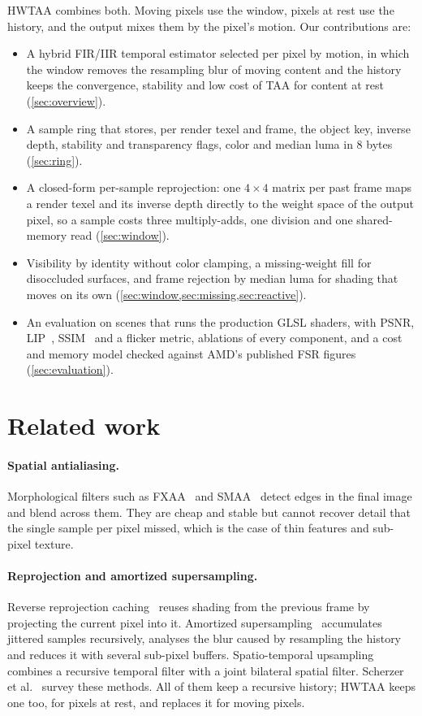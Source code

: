 \documentclass[11pt,a4paper]{article}
\newcommand{\FLIP}{\reflectbox{F}LIP}
\begin{document}
HWTAA combines both. Moving pixels use the window, pixels at rest use the history, and the output mixes them by the pixel's motion. Our contributions are:
\begin{itemize}
\item A hybrid FIR/IIR temporal estimator selected per pixel by motion, in which the window removes the resampling blur of moving content and the history keeps the convergence, stability and low cost of TAA for content at rest (\cref{sec:overview}).
\item A sample ring that stores, per render texel and frame, the object key, inverse depth, stability and transparency flags, color and median luma in 8 bytes (\cref{sec:ring}).
\item A closed-form per-sample reprojection: one $4\times4$ matrix per past frame maps a render texel and its inverse depth directly to the weight space of the output pixel, so a sample costs three multiply-adds, one division and one shared-memory read (\cref{sec:window}).
\item Visibility by identity without color clamping, a missing-weight fill for disoccluded surfaces, and frame rejection by median luma for shading that moves on its own (\cref{sec:window,sec:missing,sec:reactive}).
\item An evaluation on \nNumScenes{} scenes that runs the production GLSL shaders, with PSNR, \FLIP{}~\cite{andersson2020flip}, SSIM~\cite{wang2004ssim} and a flicker metric, ablations of every component, and a cost and memory model checked against AMD's published FSR figures (\cref{sec:evaluation}).
\end{itemize}

\section{Related work}

\paragraph{Spatial antialiasing.} Morphological filters such as FXAA~\cite{lottes2009fxaa} and SMAA~\cite{jimenez2012smaa} detect edges in the final image and blend across them. They are cheap and stable but cannot recover detail that the single sample per pixel missed, which is the case of thin features and sub-pixel texture.

\paragraph{Reprojection and amortized supersampling.} Reverse reprojection caching~\cite{nehab2007reprojection} reuses shading from the previous frame by projecting the current pixel into it. Amortized supersampling~\cite{yang2009amortized} accumulates jittered samples recursively, analyses the blur caused by resampling the history and reduces it with several sub-pixel buffers. Spatio-temporal upsampling~\cite{herzog2010upsampling} combines a recursive temporal filter with a joint bilateral spatial filter. Scherzer et al.~\cite{scherzer2012coherence} survey these methods. All of them keep a recursive history; HWTAA keeps one too, for pixels at rest, and replaces it for moving pixels.
\end{document}
